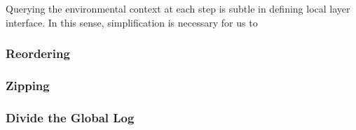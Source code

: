 Querying the environmental context at each step is subtle in defining local layer interface. 
In this sense, simplification is necessary for us to 

\subsubsection{Reordering}

\subsubsection{Zipping}


\subsubsection{Divide the Global Log}

